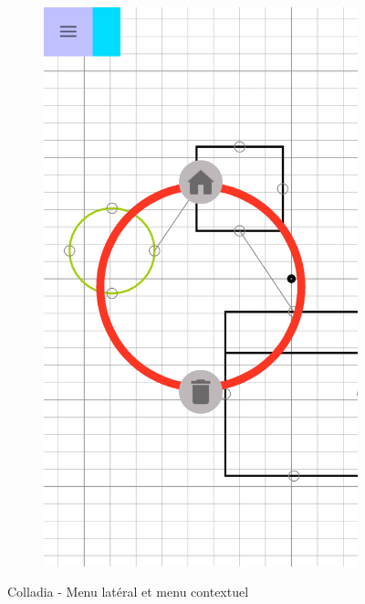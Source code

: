 \begin{itemize}
\begin{figure}[!h]
\begin{subfigure}[t]{.3\textwidth}
				\includegraphics[width=\textwidth]{img/screen/colladia_draw_view_menu_contextuel_select}
			\end{subfigure}
			\caption{Colladia - Menu latéral et menu contextuel}
		\end{figure}
		\vspace*{\fill}
		

\end{itemize}
